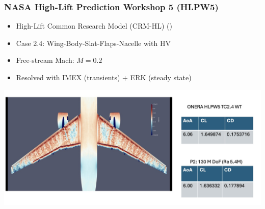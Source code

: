     \begin{frame}
    \frametitle{NASA High-Lift Prediction Workshop 5 (HLPW5)}

    \begin{itemize}
      \item High-Lift Common Research Model (CRM-HL) (\cite{bib:crm})
      \item Case 2.4: Wing-Body-Slat-Flaps-Nacelle with HV
      \item Free-stream Mach: $M = 0.2$
      \item Resolved with IMEX (transients) + ERK (steady state)
    \end{itemize}
    
    \includegraphics[width=1.0\textwidth]{images/crm.png}
    
    \end{frame}